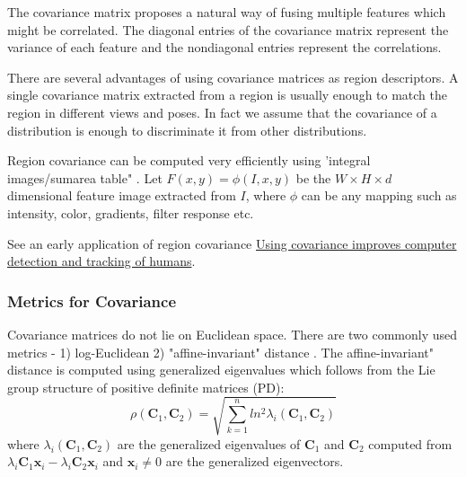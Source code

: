 The covariance matrix proposes a natural way of fusing multiple features
which might be correlated. The diagonal entries of the covariance matrix represent the variance of each feature and the nondiagonal entries represent the correlations.

There are several advantages of using covariance matrices as region descriptors. A
single covariance matrix extracted from a region is usually enough to match the
region in different views and poses. In fact we assume that the covariance of a
distribution is enough to discriminate it from other distributions.

Region covariance can be computed very efficiently using 'integral images/sumarea table" \cite{Porikli2006, Tuzel2006}. Let $F(x,y) = \phi(I,x,y)$ be the $W\times H\times d$ dimensional feature image extracted from $I$, where $\phi$ can be any mapping
such as intensity, color, gradients, filter response etc.

See an early application of region covariance 
\href{https://spie.org/news/0368-using-covariance-improves-computer-detection-and-tracking-of-humans?SSO=1}{Using covariance improves computer detection and tracking of humans}.


\subsubsection{Metrics for Covariance}
Covariance matrices do not lie on Euclidean space. There are two commonly used
metrics - 1) log-Euclidean 2) "affine-invariant" distance \cite{Forstner1999}.
The affine-invariant" distance is computed using generalized eigenvalues which follows from the Lie group structure of positive definite matrices (PD):
\begin{equation}
 \rho(\mathbf{C}_1, \mathbf{C}_2) = \sqrt{\sum\limits^n_{k=1} ln^2 \lambda_i(\mathbf{C}_1, \mathbf{C}_2)}
\end{equation}
where $\lambda_i(\mathbf{C}_1, \mathbf{C}_2)$ are the generalized eigenvalues
of $\mathbf{C}_1$ and $\mathbf{C}_2$ computed from 
$\lambda_i\mathbf{C}_1\mathbf{x}_i - \lambda_i\mathbf{C}_2\mathbf{x}_i$
and $\mathbf{x}_i \ne 0$ are the generalized eigenvectors.

